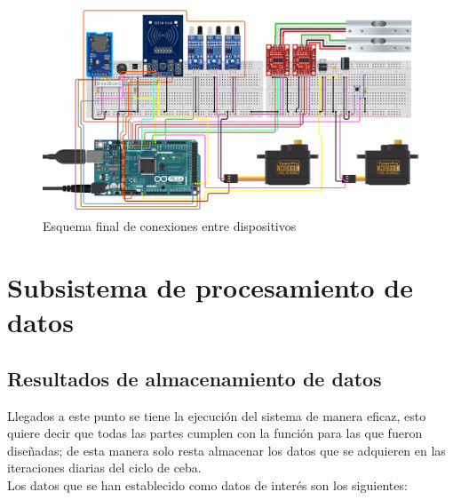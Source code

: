 \begin{figure}[H]
	\begin{center}
		\includegraphics[scale=0.64, angle=90]{img/Full_Schematic.png}
	\end{center}
	\caption{Esquema final de conexiones entre dispositivos}\label{esquemafinalpng}
\end{figure}






\section{Subsistema de procesamiento de datos}

\subsection{Resultados de almacenamiento de datos} \label{datosinteres}

Llegados a este punto se tiene la ejecución del sistema de manera eficaz, esto quiere decir que todas las partes cumplen con la función para las que fueron diseñadas; de esta manera solo resta almacenar los datos que se adquieren en las iteraciones diarias del ciclo de ceba.\\

Los datos que se han establecido como datos de interés son los siguientes:\\

